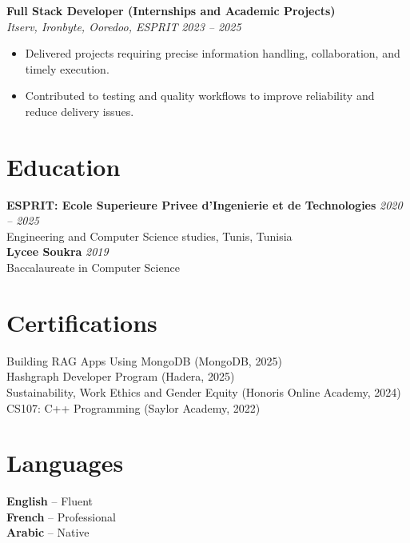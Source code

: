\documentclass[10pt,a4paper]{article}
\begin{document}
{\vspace{3pt}
\textbf{Full Stack Developer (Internships and Academic Projects)}\\[1pt]
\textit{Itserv, Ironbyte, Ooredoo, ESPRIT} \hfill \textit{2023 -- 2025}
\begin{itemize}
  \item Delivered projects requiring precise information handling, collaboration, and timely execution.
  \item Contributed to testing and quality workflows to improve reliability and reduce delivery issues.
\end{itemize}

}

\vspace{4pt}
\section*{Education}
{\small
\textbf{ESPRIT: Ecole Superieure Privee d'Ingenierie et de Technologies} \hfill \textit{2020 -- 2025}\\[1pt]
Engineering and Computer Science studies, Tunis, Tunisia\\[2pt]
\textbf{Lycee Soukra} \hfill \textit{2019}\\[1pt]
Baccalaureate in Computer Science
}

\vspace{4pt}
\section*{Certifications}
{\small
Building RAG Apps Using MongoDB (MongoDB, 2025)\\[1pt]
Hashgraph Developer Program (Hadera, 2025)\\[1pt]
Sustainability, Work Ethics and Gender Equity (Honoris Online Academy, 2024)\\[1pt]
CS107: C++ Programming (Saylor Academy, 2022)
}

\section*{Languages}
{\small
\textbf{English} -- Fluent\\[1pt]
\textbf{French} -- Professional\\[1pt]
\textbf{Arabic} -- Native
}
\end{document}
